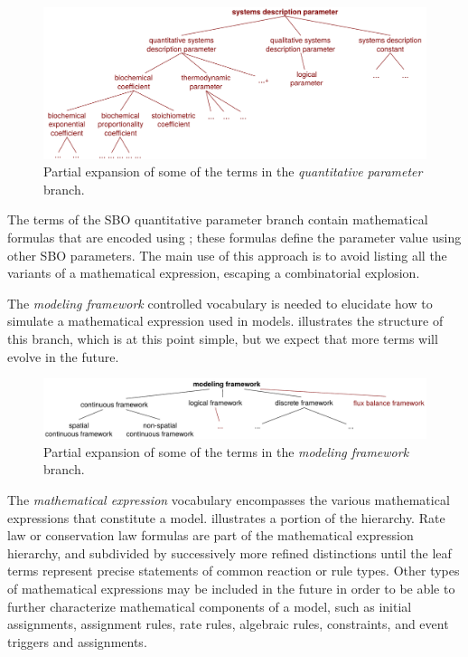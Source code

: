 \begin{figure}[tbh]
  \centering
  \vspace{-2ex}
  \includegraphics[scale = 0.69]{figs/sbo-quantitative-parameter}
  \caption{Partial expansion of some of the terms in the
    \emph{quantitative parameter} branch.}
  \label{fig:expanded-parameter}
\end{figure}

The terms of the SBO quantitative  parameter branch contain
mathematical formulas that are encoded using \mathmltwo; these
formulas define the parameter value using other SBO parameters.
The main use of this approach is to avoid listing all the variants
of a mathematical expression, escaping a combinatorial explosion.

The \emph{modeling framework} controlled vocabulary is needed to
elucidate how to simulate a mathematical expression used in models.
 illustrates the structure of
this branch, which is at this point   simple, but we
expect that more terms will evolve in the future.

\begin{figure}[tbh]
  \centering
  \vspace{-1ex}
  \includegraphics[scale = 0.66]{figs/sbo-framework}
  \caption{Partial expansion of some of the terms in the
    \emph{modeling framework} branch.}
  \label{fig:expanded-framework}
\end{figure}

The \emph{mathematical expression} vocabulary encompasses the
various mathematical expressions that constitute a model.
 illustrates a portion of the
hierarchy.  Rate law or conservation law formulas are part of the
mathematical expression hierarchy, and subdivided by successively
more refined distinctions until the leaf terms represent precise
statements of common reaction or rule types.  Other types of
mathematical expressions may be included in the future in order to
be able to further characterize mathematical components of a
model, such as initial assignments, assignment rules, rate rules,
algebraic rules, constraints, and event triggers and assignments.

